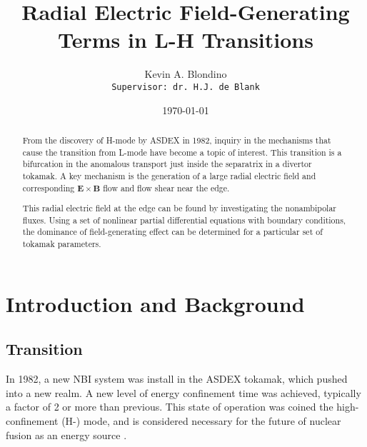 \documentclass[a4paper]{article}
\author{Kevin A. Blondino \\
	\texttt{Supervisor: dr. H.J. de Blank}}
\title{Radial Electric Field-Generating Terms in L-H Transitions}
\date{\today}
\begin{document}
\maketitle


\begin{abstract}
	From the discovery of H-mode by ASDEX in 1982, inquiry in the mechanisms that cause the transition from L-mode have become a topic of interest.
	This transition is a bifurcation in the anomalous transport just inside the separatrix in a divertor tokamak.
	A key mechanism is the generation of a large radial electric field and corresponding $\mathbf{E}\times\mathbf{B}$ flow and flow shear near the edge.

	This radial electric field at the edge can be found by investigating the nonambipolar fluxes. Using a set of nonlinear partial differential equations with boundary conditions, the dominance of field-generating effect can be determined for a particular set of tokamak parameters.
\end{abstract}

\section{Introduction and Background}
\subsection{Transition}
In 1982, a new NBI system was install in the ASDEX tokamak, which pushed into a new realm.
A new level of energy confinement time was achieved, typically a factor of 2 or more than previous.
This state of operation was coined the high-confinement (H-) mode, and is considered necessary for the future of nuclear fusion as an energy source \cite{wagner_development_1984}.
\end{document}
